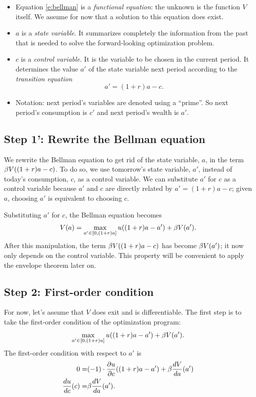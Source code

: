\documentclass[letterpaper, 11pt, leqno]{article}
\begin{document}
\begin{itemize}
\item Equation \eqref{e:bellman} is a \textit{functional equation}: the unknown is the function $V$ itself. We assume for now that a solution to this equation does exist.
\item $a$ is a \textit{state variable}. It summarizes completely the information from the past that is needed to solve the forward-looking optimization problem.
\item $c$ is a \textit{control variable}. It is the variable to be chosen in the current period. It determines the value $a'$ of the state variable next period according to the \textit{transition equation}
\begin{equation*}
a'=(1+r) a-c.
\end{equation*}
\item Notation: next period's variables are denoted using a ``prime''. So next period's consumption is $c'$ and next period's wealth is $a'$.
\end{itemize}

\subsection{Step 1': Rewrite the Bellman equation}

We rewrite the Bellman equation to get rid of the state variable, $a$, in the term $\beta V((1+r) a-c)$. To do so, we use tomorrow's state variable, $a'$, instead of today's consumption, $c$, as a control variable. We can substitute $a'$ for $c$ as a control variable because $a'$ and $c$ are directly related by $a'=(1+r) a-c$; given $a$, choosing $a'$ is equivalent to choosing $c$. 

Substituting $a'$ for $c$, the Bellman equation becomes
\begin{equation}
V(a)=\max_{a'\in[0,(1+r) a]} u((1+r) a-a')+\b V(a').\label{e:recursive}
\end{equation}
After this manipulation, the term $\beta V((1+r) a-c)$ has become $\beta V(a')$; it now only depends on the control variable. This property will be convenient to apply the envelope theorem later on.

\subsection{Step 2: First-order condition}

For now, let's assume that $V$ does exit and is differentiable. The first step is to take the first-order condition of the optimization program:
\begin{equation*}
\max_{a'\in[0,(1+r) a]} u((1+r) a-a')+\b V(a').
\end{equation*}
The first-order condition with respect to $a'$ is
\begin{align}
0 = &(-1)\cdot \pd{u}{c}((1+r) a-a')+\b \od{V}{a}(a')\nonumber\\
\od{u}{c}(c) =& \b \od{V}{a}(a').\label{e:FOC}
\end{align}
\end{document}
